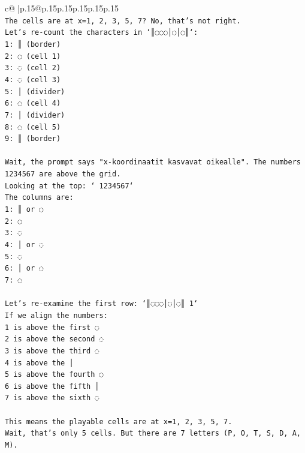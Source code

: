 \documentclass{article}
\begin{document}
{\begin{supertabular}{c@{$\;$}|p{.15\linewidth}@{}p{.15\linewidth}p{.15\linewidth}p{.15\linewidth}p{.15\linewidth}p{.15\linewidth}}
{{{\\ 
\texttt{The cells are at x=1, 2, 3, 5, 7? No, that's not right.} \\
\texttt{Let's re{-}count the characters in `║◌◌◌│◌│◌║`:} \\
\texttt{1: ║ (border)} \\
\texttt{2: ◌ (cell 1)} \\
\texttt{3: ◌ (cell 2)} \\
\texttt{4: ◌ (cell 3)} \\
\texttt{5: │ (divider)} \\
\texttt{6: ◌ (cell 4)} \\
\texttt{7: │ (divider)} \\
\texttt{8: ◌ (cell 5)} \\
\texttt{9: ║ (border)} \\
\\ 
\texttt{Wait, the prompt says "x{-}koordinaatit kasvavat oikealle". The numbers 1234567 are above the grid.} \\
\texttt{Looking at the top: ` 1234567`} \\
\texttt{The columns are:} \\
\texttt{1: ║ or ◌} \\
\texttt{2: ◌} \\
\texttt{3: ◌} \\
\texttt{4: │ or ◌} \\
\texttt{5: ◌} \\
\texttt{6: │ or ◌} \\
\texttt{7: ◌} \\
\\ 
\texttt{Let's re{-}examine the first row: `║◌◌◌│◌│◌║ 1`} \\
\texttt{If we align the numbers:} \\
\texttt{1 is above the first ◌} \\
\texttt{2 is above the second ◌} \\
\texttt{3 is above the third ◌} \\
\texttt{4 is above the │} \\
\texttt{5 is above the fourth ◌} \\
\texttt{6 is above the fifth │} \\
\texttt{7 is above the sixth ◌} \\
\\ 
\texttt{This means the playable cells are at x=1, 2, 3, 5, 7.} \\
\texttt{Wait, that's only 5 cells. But there are 7 letters (P, O, T, S, D, A, M).} \\
}}}
\end{supertabular}}
\end{document}
